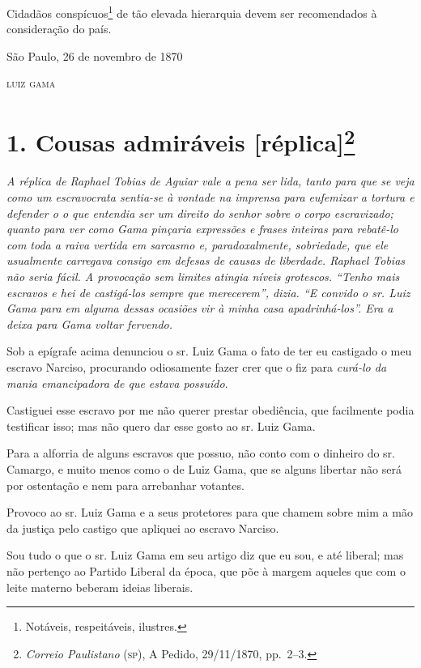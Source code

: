 {Cidadãos conspícuos\footnote{ Notáveis, respeitáveis, ilustres.} de
tão elevada hierarquia devem ser recomendados à consideração do país.

\begin{flushright}
São Paulo, 26 de novembro de 1870

\textsc{luiz gama}
\end{flushright}

\chapter{1. Cousas admiráveis {[}réplica{]}\footnote{\emph{Correio Paulistano} (\textsc{sp}), A Pedido, 29/11/1870,
  pp.~2--3.}} %

\begin{didascalia}
\emph{A réplica de Raphael Tobias de Aguiar vale a pena ser lida, tanto
para que se veja como um escravocrata sentia-se à vontade na imprensa
para eufemizar a tortura e defender o o que entendia ser um direito do
senhor sobre o corpo escravizado; quanto para ver como Gama pinçaria
expressões e frases inteiras para rebatê-lo com toda a raiva vertida em
sarcasmo e, paradoxalmente, sobriedade, que ele usualmente carregava
consigo em defesas de causas de liberdade. Raphael Tobias não seria
fácil. A provocação sem limites atingia níveis grotescos. ``Tenho mais
escravos e hei de castigá-los sempre que merecerem'', dizia. ``E convido o
sr. Luiz Gama para em alguma dessas ocasiões vir à minha casa
apadrinhá-los''. Era a deixa para Gama voltar fervendo.}
\end{didascalia}


Sob a epígrafe acima denunciou o sr. Luiz Gama o fato de ter eu
castigado o meu escravo Narciso, procurando odiosamente fazer crer que o
fiz para \emph{curá-lo da mania emancipadora de que estava possuído}.

Castiguei esse escravo por me não querer prestar obediência, que
facilmente podia testificar isso; mas não quero dar esse gosto ao sr.
Luiz Gama.

Para a alforria de alguns escravos que possuo, não conto com o dinheiro
do sr. Camargo, e muito menos como o de Luiz Gama, que se alguns
libertar não será por ostentação e nem para arrebanhar votantes.

Provoco ao sr. Luiz Gama e a seus protetores para que chamem sobre mim a
mão da justiça pelo castigo que apliquei ao escravo Narciso.

Sou tudo o que o sr. Luiz Gama em seu artigo diz que eu sou, e até
liberal; mas não pertenço ao Partido Liberal da época, que põe à margem
aqueles que com o leite materno beberam ideias liberais.

}

